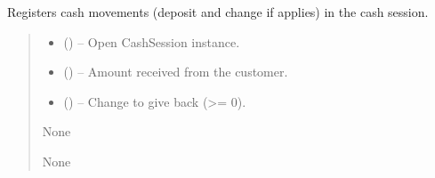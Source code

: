 \documentclass[a4paper,11pt,spanish]{sphinxmanual}
\begin{document}
\begin{fulllineitems}
\label{\detokenize{api/sale/sale.services:sale.services.register_cash_movements}}
\pysigstartsignatures
\pysiglinewithargsret
{}
{\sphinxparamcomma {}\sphinxparamcomma {}}
{}
\pysigstopsignatures
\sphinxAtStartPar
Registers cash movements (deposit and change if applies) in the cash session.
\begin{quote}\begin{description}
\begin{itemize}
\item {} 
\sphinxAtStartPar
{} ({\hyperref[\detokenize{api/CashRegister/CashRegister.models:CashRegister.models.CashSession}]{}}) – Open CashSession instance.

\item {} 
\sphinxAtStartPar
{} () – Amount received from the customer.

\item {} 
\sphinxAtStartPar
{} () – Change to give back (>= 0).

\end{itemize}

\sphinxAtStartPar
None

\sphinxAtStartPar
None

\end{description}\end{quote}

\end{fulllineitems}

\end{document}
